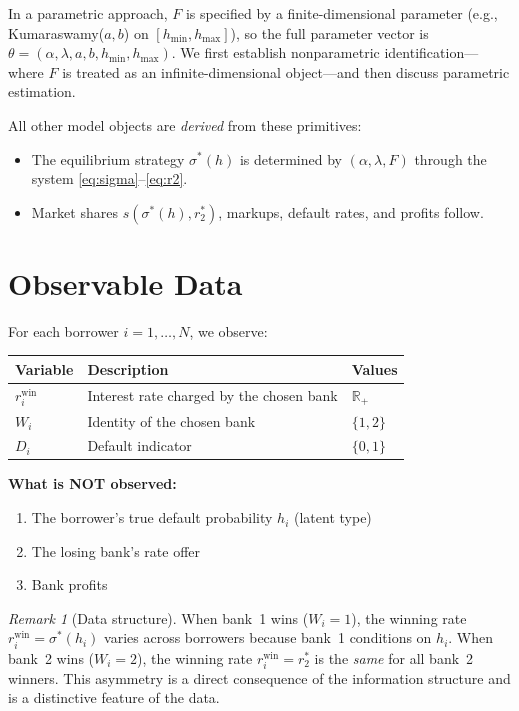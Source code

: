 \documentclass[12pt]{article}
\theoremstyle{plain}
\theoremstyle{plain}
\theoremstyle{definition}  %
\theoremstyle{remark}  %
\newtheorem{remark}[thm]{Remark}  %
\begin{document}
\medskip\noindent
In a parametric approach, $F$ is specified by a finite-dimensional parameter (e.g., Kumaraswamy($a,b$) on $[h_{\min}, h_{\max}]$), so the full parameter vector is $\theta = (\alpha, \lambda, a, b, h_{\min}, h_{\max})$. We first establish nonparametric identification---where $F$ is treated as an infinite-dimensional object---and then discuss parametric estimation.

\medskip\noindent
All other model objects are \emph{derived} from these primitives:
\begin{itemize}
    \item The equilibrium strategy $\sigma^*(h)$ is determined by $(\alpha, \lambda, F)$ through the system \eqref{eq:sigma}--\eqref{eq:r2}.
    \item Market shares $s(\sigma^*(h), r_2^*)$, markups, default rates, and profits follow.
\end{itemize}


\section{Observable Data}\label{sec:data}

For each borrower $i = 1, \ldots, N$, we observe:
\begin{center}
\renewcommand{\arraystretch}{1.3}
\begin{tabular}{lll}
\toprule
\textbf{Variable} & \textbf{Description} & \textbf{Values} \\
\midrule
$r_i^{\text{win}}$ & Interest rate charged by the chosen bank & $\mathbb{R}_+$ \\
$W_i$ & Identity of the chosen bank & $\{1, 2\}$ \\
$D_i$ & Default indicator & $\{0, 1\}$ \\
\bottomrule
\end{tabular}
\end{center}

\medskip\noindent
\textbf{What is NOT observed:}
\begin{enumerate}
    \item The borrower's true default probability $h_i$ (latent type)
    \item The losing bank's rate offer
    \item Bank profits
\end{enumerate}

\begin{remark}[Data structure]
When bank~1 wins ($W_i = 1$), the winning rate $r_i^{\text{win}} = \sigma^*(h_i)$ varies across borrowers because bank~1 conditions on $h_i$. When bank~2 wins ($W_i = 2$), the winning rate $r_i^{\text{win}} = r_2^*$ is the \emph{same} for all bank~2 winners. This asymmetry is a direct consequence of the information structure and is a distinctive feature of the data.
\end{remark}
\end{document}
